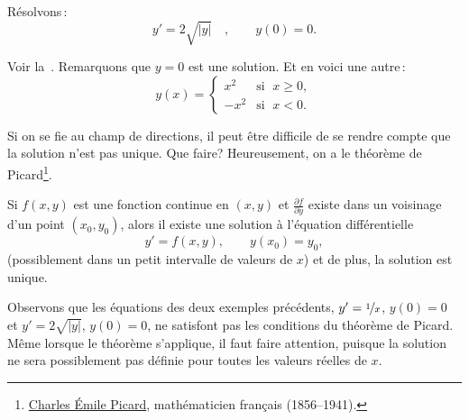 \begin{example}
Résolvons\,:
\begin{equation*}
y' = 2 \sqrt{\lvert y \rvert}\quad ,\qquad y(0) = 0 .
\end{equation*}

Voir la~.
Remarquons que $y=0$ est une solution.  Et en voici une autre\,:
\begin{equation*}
y(x) =
\begin{cases}
x^2 & \text{si } \; x \geq 0,\\
-x^2 & \text{si } \; x < 0.
\end{cases}
\end{equation*}
\end{example}
Si on se fie au champ de directions, il peut être difficile de se rendre compte que la solution n'est pas unique.  Que faire?  Heureusement, on a le théorème de Picard\footnote{
\href{https://fr.wikipedia.org/wiki/Charles_\%C3\%89mile_Picard}{Charles \'Emile Picard}, mathématicien français
(1856--1941).}. 

\begin{theorem}%
\label{slope:picardthm}%
Si $f(x,y)$ est une fonction continue en $(x,y)$ et $\frac{\partial f}{\partial y}$ existe dans un voisinage d'un point $(x_0,y_0)$, alors il existe une solution à l'équation différentielle
\begin{equation*}
y' = f(x,y), \qquad y(x_0) = y_0,
\end{equation*}
(possiblement dans un petit intervalle de valeurs de $x$) et de plus, la solution est unique.
\end{theorem}

Observons que les équations des deux exemples précédents, $y' = \nicefrac{1}{x}$, $y(0) = 0$ et 
$y' = 2 \sqrt{\lvert y \rvert}$, $y(0) = 0$, ne satisfont pas les conditions du théorème de Picard.  Même lorsque le théorème s'applique, il faut faire attention, puisque la solution ne sera possiblement pas définie pour toutes les valeurs réelles de $x$.

